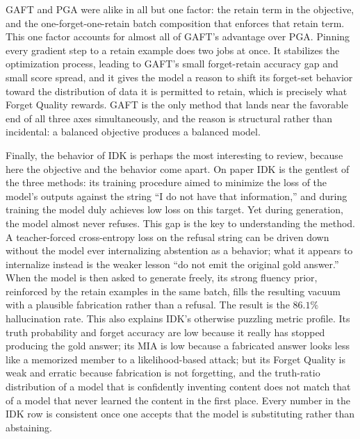 \documentclass[a4paper,12pt]{report}
\begin{document}
GAFT and PGA were alike in all but one factor: the retain term in the objective, and the one-forget-one-retain batch composition that enforces that retain term. This one factor accounts for almost all of GAFT's advantage over PGA. Pinning every gradient step to a retain example does two jobs at once. It stabilizes the optimization process, leading to GAFT's small forget-retain accuracy gap and small score spread, and it gives the model a reason to shift its forget-set behavior toward the distribution of data it is permitted to retain, which is precisely what Forget Quality rewards. GAFT is the only method that lands near the favorable end of all three axes simultaneously, and the reason is structural rather than incidental: a balanced objective produces a balanced model.

Finally, the behavior of IDK is perhaps the most interesting to review, because here the objective and the behavior come apart. On paper IDK is the gentlest of the three methods: its training procedure aimed to minimize the loss of the model's outputs against the string ``I do not have that information,'' and during training the model duly achieves low loss on this target. Yet during generation, the model almost never refuses. This gap is the key to understanding the method. A teacher-forced cross-entropy loss on the refusal string can be driven down without the model ever internalizing abstention as a behavior; what it appears to internalize instead is the weaker lesson ``do not emit the original gold answer.'' When the model is then asked to generate freely, its strong fluency prior, reinforced by the retain examples in the same batch, fills the resulting vacuum with a plausible fabrication rather than a refusal. The result is the $86.1\%$ hallucination rate. This also explains IDK's otherwise puzzling metric profile. Its truth probability and forget accuracy are low because it really has stopped producing the gold answer; its MIA is low because a fabricated answer looks less like a memorized member to a likelihood-based attack; but its Forget Quality is weak and erratic because fabrication is not forgetting, and the truth-ratio distribution of a model that is confidently inventing content does not match that of a model that never learned the content in the first place. Every number in the IDK row is consistent once one accepts that the model is substituting rather than abstaining.
\end{document}
